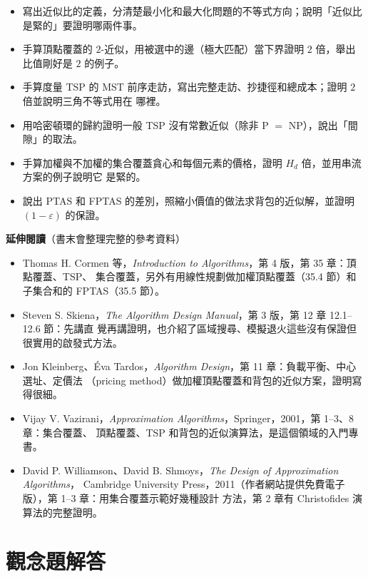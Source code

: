 \begin{itemize}
\item 寫出近似比的定義，分清楚最小化和最大化問題的不等式方向；說明「近似比是緊的」要證明哪兩件事。
\item 手算頂點覆蓋的 $2$-近似，用被選中的邊（極大匹配）當下界證明 $2$ 倍，舉出比值剛好是 $2$ 的例子。
\item 手算度量 TSP 的 MST 前序走訪，寫出完整走訪、抄捷徑和總成本；證明 $2$ 倍並說明三角不等式用在
哪裡。
\item 用哈密頓環的歸約證明一般 TSP 沒有常數近似（除非 P $=$ NP），說出「間隙」的取法。
\item 手算加權與不加權的集合覆蓋貪心和每個元素的價格，證明 $H_d$ 倍，並用串流方案的例子說明它
是緊的。
\item 說出 PTAS 和 FPTAS 的差別，照縮小價值的做法求背包的近似解，並證明 $(1 - \varepsilon)$ 的保證。
\end{itemize}

\textbf{延伸閱讀}（書末會整理完整的參考資料）

\begin{itemize}
\item Thomas H. Cormen 等，\textit{Introduction to Algorithms}，第 4 版，第 35 章：頂點覆蓋、TSP、
集合覆蓋，另外有用線性規劃做加權頂點覆蓋（35.4 節）和子集合和的 FPTAS（35.5 節）。
\item Steven S. Skiena，\textit{The Algorithm Design Manual}，第 3 版，第 12 章 12.1--12.6 節：先講直
覺再講證明，也介紹了區域搜尋、模擬退火這些沒有保證但很實用的啟發式方法。
\item Jon Kleinberg、Éva Tardos，\textit{Algorithm Design}，第 11 章：負載平衡、中心選址、定價法
（pricing method）做加權頂點覆蓋和背包的近似方案，證明寫得很細。
\item Vijay V. Vazirani，\textit{Approximation Algorithms}，Springer，2001，第 1--3、8 章：集合覆蓋、
頂點覆蓋、TSP 和背包的近似演算法，是這個領域的入門專書。
\item David P. Williamson、David B. Shmoys，\textit{The Design of Approximation Algorithms}，
Cambridge University Press，2011（作者網站提供免費電子版），第 1--3 章：用集合覆蓋示範好幾種設計
方法，第 2 章有 Christofides 演算法的完整證明。
\end{itemize}

\section*{觀念題解答}

